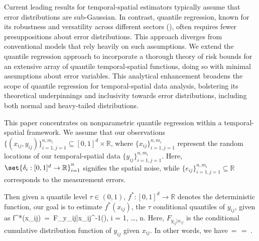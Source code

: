 \documentclass[twoside,11pt]{article}
\begin{document}
Current leading results for temporal-spatial estimators typically assume that error distributions are sub-Gaussian. In contrast, quantile regression, known for its robustness and versatility across different sectors (\cite{coad2006innovation, sanderson2006statistically, perlich2007high, benoit2009benefits, wasko2014quantile, pata2015astronomical, belloni2023high,zhang2023risk}), often requires fewer presuppositions about error distributions. This approach diverges from conventional models that rely heavily on such assumptions. We extend the quantile regression approach to incorporate a thorough theory of risk bounds for an extensive array of quantile temporal-spatial functions, doing so with minimal assumptions about error variables. This analytical enhancement broadens the scope of quantile regression for temporal-spatial data analysis, bolstering its theoretical underpinnings and inclusivity towards error distributions, including both normal and heavy-tailed distributions.




This paper concentrates on nonparametric quantile regression within a temporal-spatial framework. We assume that our observations $\{(x_{ij}, y_{ij})\}_{i=1,j=1}^{n,m_i} \subseteq [0, 1]^d \times \mathbb{R}$, where $\{x_{ij}\}_{i=1,j=1}^{n,m_i}$ represent the random locations of our temporal-spatial data $\{y_{ij}\}_{i=1,j=1}^{n,m_i}$. Here, $\set{\delta_i : [0, 1]^d \to \mathbb{R}}_{i=1}^n$ signifies the spatial noise, while $\{e_{ij}\}_{i=1,j=1}^{n,m_i} \subseteq \mathbb{R}$ corresponds to the measurement errors. 







Then given a quantile level $\tau \in (0,1)$, 
$f^* : [0, 1]^d \to \mathbb{R}$ denotes the deterministic function,
our goal is to estimate $f^*(x_{ij})$, the $\tau$ conditional quantiles of $y_{ij}$, given as
\bea
f^*(x_{ij}) \,=\, F_{y_{ij}|x_{ij}}^{-1}(\tau), \quad {} i = 1, \ldots, n.
\bea
Here, $F_{y_{ij}|x_{ij}}$ is the conditional cumulative distribution function of $y_{ij}$ given $x_{ij}$. 
In other words, we have 
\bea 
{} \,=\,
 \,=\, \tau. 
\bea 
\end{document}
